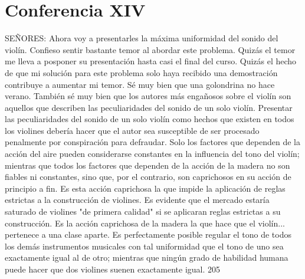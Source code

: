 \chapter*{Conferencia XIV}
SEÑORES: Ahora voy a presentarles la máxima uniformidad del sonido del violín. Confieso sentir bastante temor al abordar este problema. Quizás el temor me lleva a posponer su presentación hasta casi el final del curso. Quizás el hecho de que mi solución para este problema solo haya recibido una demostración contribuye a aumentar mi temor. Sé muy bien que una golondrina no hace verano. También sé muy bien que los autores más engañosos sobre el violín son aquellos que describen las peculiaridades del sonido de un solo violín. Presentar las peculiaridades del sonido de un solo violín como hechos que existen en todos los violines debería hacer que el autor sea susceptible de ser procesado penalmente por conspiración para defraudar.
Solo los factores que dependen de la acción del aire pueden considerarse constantes en la influencia del tono del violín; mientras que todos los factores que dependen de la acción de la madera no son fiables ni constantes, sino que, por el contrario, son caprichosos en su acción de principio a fin. Es esta acción caprichosa la que impide la aplicación de reglas estrictas a la construcción de violines. Es evidente que el mercado estaría saturado de violines "de primera calidad" si se aplicaran reglas estrictas a su construcción. Es la acción caprichosa de la madera la que hace que el violín...
pertenece a una clase aparte. Es perfectamente posible regular el tono de todos los demás instrumentos musicales con tal uniformidad que el tono de uno sea exactamente igual al de otro; mientras que ningún grado de habilidad humana puede hacer que dos violines suenen exactamente igual.
205


